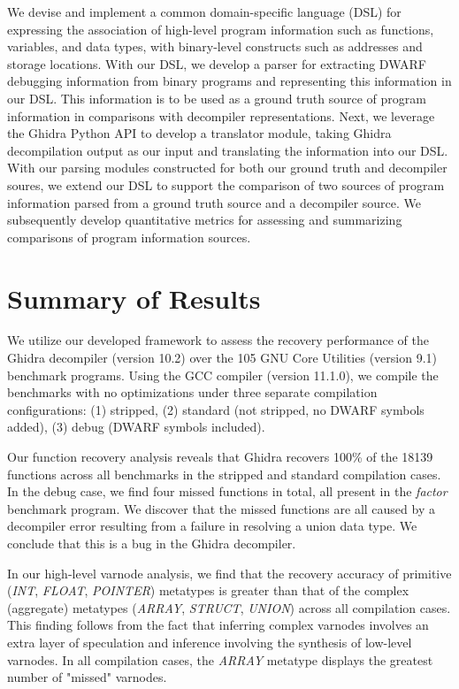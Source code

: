 We devise and implement a common domain-specific language (DSL) for expressing the association of high-level program information such as functions, variables, and data types, with binary-level constructs such as addresses and storage locations. With our DSL, we develop a parser for extracting DWARF debugging information from binary programs and representing this information in our DSL. This information is to be used as a ground truth source of program information in comparisons with decompiler representations. Next, we leverage the Ghidra Python API to develop a translator module, taking Ghidra decompilation output as our input and translating the information into our DSL. With our parsing modules constructed for both our ground truth and decompiler soures, we extend our DSL to support the comparison of two sources of program information parsed from a ground truth source and a decompiler source. We subsequently develop quantitative metrics for assessing and summarizing comparisons of program information sources.

\section{Summary of Results}

We utilize our developed framework to assess the recovery performance of the Ghidra decompiler (version 10.2) over the 105 GNU Core Utilities (version 9.1) benchmark programs. Using the GCC compiler (version 11.1.0), we compile the benchmarks with no optimizations under three separate compilation configurations: (1) stripped, (2) standard (not stripped, no DWARF symbols added), (3) debug (DWARF symbols included).

Our function recovery analysis reveals that Ghidra recovers 100\% of the 18139 functions across all benchmarks in the stripped and standard compilation cases. In the debug case, we find four missed functions in total, all present in the \emph{factor} benchmark program. We discover that the missed functions are all caused by a decompiler error resulting from a failure in resolving a union data type. We conclude that this is a bug in the Ghidra decompiler.

In our high-level varnode analysis, we find that the recovery accuracy of primitive (\emph{INT}, \emph{FLOAT}, \emph{POINTER}) metatypes is greater than that of the complex (aggregate) metatypes (\emph{ARRAY}, \emph{STRUCT}, \emph{UNION}) across all compilation cases. This finding follows from the fact that inferring complex varnodes involves an extra layer of speculation and inference involving the synthesis of low-level varnodes. In all compilation cases, the \emph{ARRAY} metatype displays the greatest number of "missed" varnodes.

